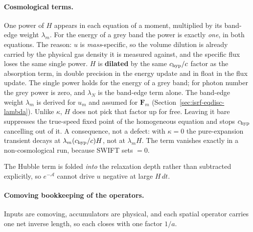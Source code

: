 \paragraph{Cosmological terms.} One power of $H$ appears in each equation of a moment, multiplied by its band-edge weight $\lambda_m$. For the energy of a grey band the power is exactly \emph{one}, in both
equations. The reason: $u$ is
\emph{mass}-specific, so the volume dilution is already carried by the physical
gas density it is measured against, and the specific flux loses the same single
power. $H$ is \textbf{dilated} by the same $c_{\rm hyp}/c$ factor as the
absorption term, in double precision in the energy update and in float in the
flux update. The single power holds for the energy of a grey band;
for photon number the grey power is zero, and $\lambda_N$ is the band-edge term alone. The band-edge
weight $\lambda_m$ is derived for $u_m$ and assumed for $\boldsymbol{F}_m$
(Section~\ref{sec:isrf-eqdisc-lambda}). Unlike $\kappa$, $H$ does not pick
that factor up for free. Leaving it bare suppresses the true-speed fixed point of
the homogeneous equation and stops $c_{\rm hyp}$ cancelling out of it. A
consequence, not a defect: with $\kappa = 0$ the pure-expansion transient decays
at $\lambda_m(c_{\rm hyp}/c)H$, not at $\lambda_m H$. The term vanishes exactly in a
non-cosmological run, because SWIFT sets  $=0$.

The Hubble term is folded \emph{into} the relaxation depth rather than subtracted
explicitly, so $e^{-\mathcal{A}}$ cannot drive $u$ negative at large $H\,dt$.

\paragraph{Comoving bookkeeping of the operators.} Inputs are comoving,
accumulators are physical, and each spatial operator carries one net inverse
length, so each closes with one factor $1/a$.

